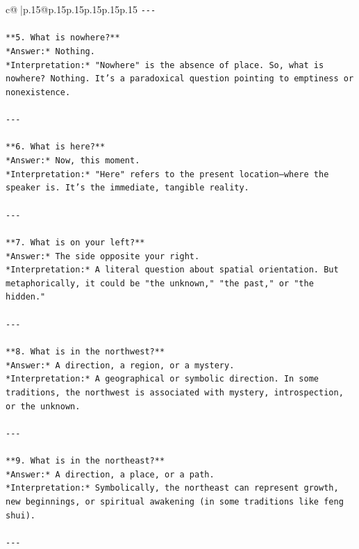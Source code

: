 \documentclass{article}
\begin{document}
{\begin{supertabular}{c@{$\;$}|p{.15\linewidth}@{}p{.15\linewidth}p{.15\linewidth}p{.15\linewidth}p{.15\linewidth}p{.15\linewidth}}
{{{\texttt{{-}{-}{-}} \\
\\ 
\texttt{**5. What is nowhere?**  } \\
\texttt{*Answer:* Nothing.  } \\
\texttt{*Interpretation:* "Nowhere" is the absence of place. So, what is nowhere? Nothing. It’s a paradoxical question pointing to emptiness or nonexistence.} \\
\\ 
\texttt{{-}{-}{-}} \\
\\ 
\texttt{**6. What is here?**  } \\
\texttt{*Answer:* Now, this moment.  } \\
\texttt{*Interpretation:* "Here" refers to the present location—where the speaker is. It’s the immediate, tangible reality.} \\
\\ 
\texttt{{-}{-}{-}} \\
\\ 
\texttt{**7. What is on your left?**  } \\
\texttt{*Answer:* The side opposite your right.  } \\
\texttt{*Interpretation:* A literal question about spatial orientation. But metaphorically, it could be "the unknown," "the past," or "the hidden."} \\
\\ 
\texttt{{-}{-}{-}} \\
\\ 
\texttt{**8. What is in the northwest?**  } \\
\texttt{*Answer:* A direction, a region, or a mystery.  } \\
\texttt{*Interpretation:* A geographical or symbolic direction. In some traditions, the northwest is associated with mystery, introspection, or the unknown.} \\
\\ 
\texttt{{-}{-}{-}} \\
\\ 
\texttt{**9. What is in the northeast?**  } \\
\texttt{*Answer:* A direction, a place, or a path.  } \\
\texttt{*Interpretation:* Symbolically, the northeast can represent growth, new beginnings, or spiritual awakening (in some traditions like feng shui).} \\
\\ 
\texttt{{-}{-}{-}} \\
}}}
\end{supertabular}}
\end{document}
